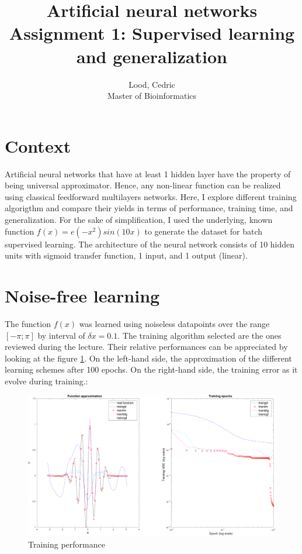 \documentclass[11pt, a4paper]{article}
\title{ \huge Artificial neural networks \\ 
  { \large Assignment 1: Supervised learning and generalization }}
\author{
        Lood, Cedric \\
        \small Master of Bioinformatics
}
\begin{document}
\maketitle

\section{Context}

Artificial neural networks that have at least 1 hidden layer have the
property of being universal
approximator\cite{hornik1989multilayer,leshno1993multilayer}. Hence,
any non-linear function can be realized using classical feedforward
multilayers networks. Here, I explore different training algorigthm
and compare their yields in terms of performance, training time, and
generalization. For the sake of simplification, I used the underlying,
known function $f(x)=e(-x^2)sin(10x)$ to generate the dataset for
batch supervised learning. The architecture of the neural network
consists of 10 hidden units with sigmoid transfer function, 1 input,
and 1 output (linear).

\section{Noise-free learning}

The function $f(x)$ was learned using noiseless datapoints over the
range $[-\pi;\pi]$ by interval of $\delta x = 0.1$. The training
algorithm selected are the ones reviewed during the lecture. Their
relative performances can be appreciated by looking at the figure
\ref{fig:trainnl}. On the left-hand side, the approximation of the
different learning schemes after 100 epochs. On the right-hand side,
the training error as it evolve during training.:

\begin{figure}[H]
  \includegraphics[scale=.43]{training_performance.pdf}
  \caption{Training performance}
  \label{fig:trainnl}
\end{figure}
\end{document}
